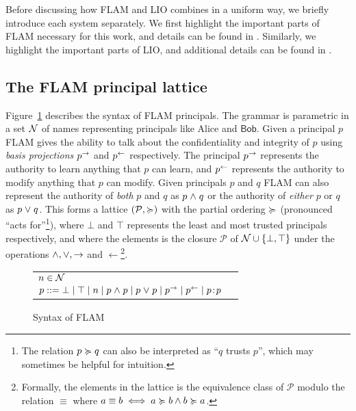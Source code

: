 Before discussing how FLAM and LIO combines in a uniform way, we briefly introduce each system separately. We first highlight the important parts of FLAM necessary for this work, and details can be found in \cite{Arden:2015:FA:2859845.2859998}. Similarly, we highlight the important parts of LIO, and additional details can be found in \cite{SRMMlio}.

\subsection{The FLAM principal lattice}
Figure~\ref{fig:flam-syntax} describes the syntax of FLAM principals. The grammar is parametric in a set $\mathcal{N}$ of names representing principals like Alice and $\mathsf{Bob}$. Given a principal $p$ FLAM gives the ability to talk about the confidentiality and integrity of $p$ using \emph{basis projections} $p^{\rightarrow}$ and $p^{\leftarrow}$ respectively. The principal $p^{\rightarrow}$ represents the authority to learn anything that $p$ can learn, and $p^{\leftarrow}$ represents the authority to modify anything that $p$ can modify. Given principals $p$ and $q$ FLAM can also represent the authority of \emph{both} $p$ and $q$ as $p \mathrel{\land} q$ or the authority of \emph{either} $p$ or $q$ as $p \mathrel{\lor} q$. This forms a lattice $(\mathcal{P}, \succcurlyeq)$ with the partial ordering $\succcurlyeq$ (pronounced ``acts for''\footnote{The relation $p \succcurlyeq q$ can also be interpreted as ``$q$ trusts $p$'', which may sometimes be helpful for intuition.}), where $\bot$ and $\top$ represents the least and most trusted principals respectively, and where the elements is the closure $\mathcal{P}$ of $\mathcal{N} \cup \{\bot, \top\}$ under the operations $\mathrel{\land}, \mathrel{\lor}, \rightarrow$ and $\leftarrow$\footnote{Formally, the elements in the lattice is the equivalence class of $\mathcal{P}$ modulo the relation $\equiv$ where $a \equiv b \iff a \succcurlyeq b \wedge b \succcurlyeq a$.}.

\begin{figure}
    \centering
    \begin{tabular}{ll}
    $n \in \mathcal{N}$ \\
    $p ::= \bot \mid \top \mid n \mid p \mathrel{\land} p \mid p \mathrel{\lor} p \mid p^{\rightarrow} \mid p^{\leftarrow} \mid p\!:\!p$
    \end{tabular}
    \caption{Syntax of FLAM}
    \label{fig:flam-syntax}
\end{figure}

